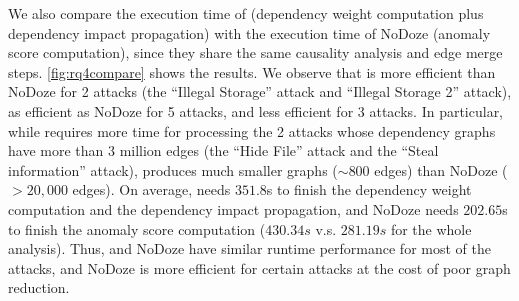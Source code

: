 We also compare the execution time of \tool (dependency weight computation plus dependency impact propagation) with the execution time of NoDoze (anomaly score computation), since they share the same causality analysis and edge merge steps.
\cref{fig:rq4compare} shows the results.
%
We observe that \tool is more efficient than NoDoze for 2 attacks (\ie the ``Illegal Storage'' attack and ``Illegal Storage 2'' attack), as efficient as NoDoze for 5 attacks, and less efficient for 3 attacks.
In particular, while \tool requires more time for processing the 2 attacks whose dependency graphs have more than 3 million edges (\ie the ``Hide File'' attack and the ``Steal information'' attack), \tool produces much smaller graphs ($\sim800$ edges) than NoDoze ($>20,000$ edges).
On average, \tool needs $351.8$s to finish the dependency weight computation and the dependency impact propagation, and NoDoze needs $202.65$s to finish the anomaly score computation ($430.34s$ v.s. $281.19s$ for the whole analysis).
%
Thus, \tool and NoDoze have similar runtime performance for most of the attacks, and NoDoze is more efficient for certain attacks at the cost of poor graph reduction. 



